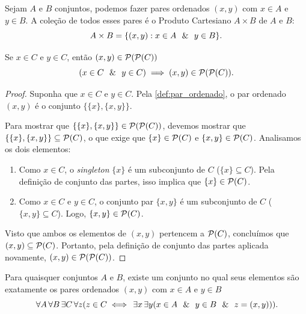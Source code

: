 \begin{definicao}
    \label{def:produto_cartesiano}
    Sejam \(A\) e \(B\) conjuntos, podemos fazer pares ordenados \((x,y)\) com \(x \in A\) e \(y \in B\). A coleção de todos esses pares é o Produto Cartesiano \(A \times B\) de \(A\) e \(B\):
    \[
        A \times B = \{(x,y): x \in A \ \ \& \ \  y \in B\}.
    \]
\end{definicao}



\begin{proposicao}
    \label{prop:power_power}
    Se \(x \in C\) e \(y \in C\), então \((x,y) \in \mathcal{P}(\mathcal{P}(C))\)
    \[
        (x \in C \ \ \& \ \  y \in C) \implies (x,y) \in \mathcal{P}(\mathcal{P}(C)).
    \]
\end{proposicao}

\begin{proof}
    Suponha que \(x \in C\) e \(y \in C\). Pela \autoref{def:par_ordenado}, o par ordenado \((x,y)\) é o conjunto \(\{\{x\}, \{x,y\}\}\).

    Para mostrar que \(\{\{x\}, \{x,y\}\} \in \mathcal{P}(\mathcal{P}(C))\), devemos mostrar que \(\{\{x\}, \{x,y\}\} \subseteq \mathcal{P}(C)\), o que exige que \(\{x\} \in \mathcal{P}(C)\) e \(\{x,y\} \in \mathcal{P}(C)\). Analisamos os dois elementos:

    \begin{enumerate}
        \item Como \(x \in C\), o \textit{singleton} \(\{x\}\) é um subconjunto de \(C\) (\(\{x\} \subseteq C\)). Pela definição de conjunto das partes, isso implica que \(\{x\} \in \mathcal{P}(C)\).
        \item Como \(x \in C\) e \(y \in C\), o conjunto par \(\{x,y\}\) é um subconjunto de \(C\) (\(\{x,y\} \subseteq C\)). Logo, \(\{x,y\} \in \mathcal{P}(C)\).
    \end{enumerate}

    Visto que ambos os elementos de \((x,y)\) pertencem a \(\mathcal{P}(C)\), concluímos que \((x,y) \subseteq \mathcal{P}(C)\). Portanto, pela definição de conjunto das partes aplicada novamente, \((x,y) \in \mathcal{P}(\mathcal{P}(C))\).
\end{proof}

\begin{corolario}
    \label{cor:existencia_par_odernado}
    Para quaisquer conjuntos \(A\) e \(B\), existe um conjunto no qual seus elementos são exatamente os pares ordenados \((x,y)\) com \(x \in A\) e \(y \in B\)
    \[
        \forall A \forall B \exists C \forall z (z \in C \iff \exists x \exists y (x \in A \e y \in B \e z = (x,y))).
    \]
\end{corolario}

